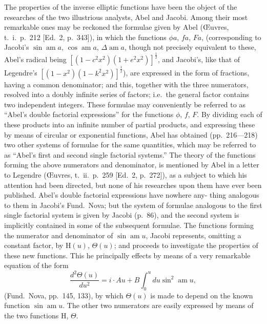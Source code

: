 \documentclass[12pt,a4paper]{article}
\begin{document}
The properties of the inverse elliptic functions have been the object of the
researches of the two illustrious analysts, Abel and Jacobi. Among their most remarkable
ones may be reckoned the formulae given by Abel (\OE uvres, t.~i.\ p.~212 [Ed.~2, p.~343]), in
which the functions $\phi a$, $fa$, $Fa$, (corresponding to Jacobi's $\sin \operatorname{am} a$, $\cos \operatorname{am} a$, $\Delta \operatorname{am} a$,
though not precisely equivalent to these, Abel's radical being $[(1 - c^2x^2)(1 + e^2x^2)]^{\frac{1}{2}}$, and
Jacobi's, like that of Legendre's $[(1 - x^2)(1 - k^2x^2)]^{\frac{1}{2}}$), are expressed in the form of fractions,
having a common denominator; and this, together with the three numerators, resolved
into a doubly infinite series of factors; i.e.\ the general factor contains two independent
integers. These formulae may conveniently be referred to as ``Abel's double factorial
expressions'' for the functions $\phi$, $f$, $F$. By dividing each of these products into an
infinite number of partial products, and expressing these by means of circular or
exponential functions, Abel has obtained (pp.~216---218) two other systems of formulae for
the same quantities, which may be referred to as ``Abel's first and second single factorial
systems.'' The theory of the functions forming the above numerators and denominator,
is mentioned by Abel in a letter to Legendre (\OE uvres, t.~ii.\ p.~259 [Ed.~2, p.~272]), as
a subject to which his attention had been directed, but none of his researches upon
them have ever been published. Abel's double factorial expressions have nowhere any-
thing analogous to them in Jacobi's Fund.\ Nova; but the system of formulae analogous
to the first single factorial system is given by Jacobi (p.~86), and the second system
is implicitly contained in some of the subsequent formulae. The functions forming the
numerator and denominator of $\sin \operatorname{am} u$, Jacobi represents, omitting a constant factor,
by $\mathrm{H}(u)$, $\Theta(u)$; and proceeds to investigate the properties of these new functions. This
he principally effects by means of a very remarkable equation of the form
\[
\frac{d^2\Theta(u)}{du^2} = i \cdot Au + B \int_0^u du \sin^2 \operatorname{am} u,
\]
(Fund.\ Nova, pp.~145, 133), by which $\Theta(u)$ is made to depend on the known function
$\sin \operatorname{am} u$. The other two numerators are easily expressed by means of the two
functions $\mathrm{H}$, $\Theta$.
\end{document}
